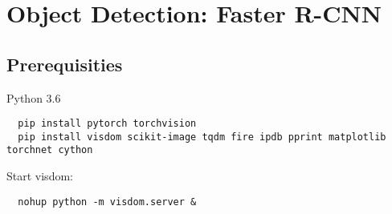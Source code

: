 
\chapter{Object Detection: Faster R-CNN}

\section{Prerequisities}

Python 3.6

\begin{lstlisting}
  pip install pytorch torchvision
  pip install visdom scikit-image tqdm fire ipdb pprint matplotlib torchnet cython
\end{lstlisting}


Start visdom:
\begin{lstlisting}
  nohup python -m visdom.server &
\end{lstlisting}


